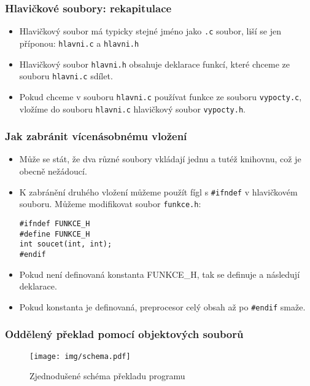 \documentclass{beamer}
\newenvironment{itemizex}%
  {\large \begin{itemize}%
    \setlength{\itemsep}{8pt}%
    \setlength{\parskip}{8pt}}%
  {\end{itemize}}
\begin{document}
\begin{frame}[t,fragile]\frametitle{Hlavičkové soubory: rekapitulace} 
    \begin{itemizex}
        \item Hlavičkový soubor má typicky stejné jméno jako \texttt{.c} soubor, liší se jen příponou: \texttt{hlavni.c} a \texttt{hlavni.h}
        \item Hlavičkový soubor \texttt{hlavni.h} obsahuje deklarace funkcí, které chceme ze souboru \texttt{hlavni.c} sdílet.
        \item Pokud chceme v souboru \texttt{hlavni.c} používat funkce ze souboru \texttt{vypocty.c}, vložíme do souboru \texttt{hlavni.c} hlavičkový soubor \texttt{vypocty.h}.
    \end{itemizex}
\end{frame}


\begin{frame}[t,fragile]\frametitle{Jak zabránit vícenásobnému vložení} 
    \begin{itemize}
        \item Může se stát, že dva různé soubory vkládají jednu a tutéž knihovnu, což je obecně nežádoucí.
        \item K zabránění druhého vložení můžeme použít fígl s \texttt{\#ifndef} v hlavičkovém souboru. Můžeme modifikovat soubor \texttt{funkce.h}:
\begin{verbatim} 
#ifndef FUNKCE_H
#define FUNKCE_H
int soucet(int, int);
#endif
\end{verbatim}
        \item Pokud není definovaná konstanta FUNKCE\_H, tak se definuje a následují deklarace.
        \item Pokud konstanta je definovaná, preprocesor celý obsah až po \texttt{\#endif} smaže. 
    \end{itemize}
\end{frame}


\begin{frame}[t,fragile]\frametitle{Oddělený překlad pomocí objektových souborů} 
\begin{figure}[htb]
    \centering
    \texttt{[image: img/schema.pdf]}
    \caption{Zjednodušené schéma překladu programu}
\end{figure}
\end{frame}
\end{document}
